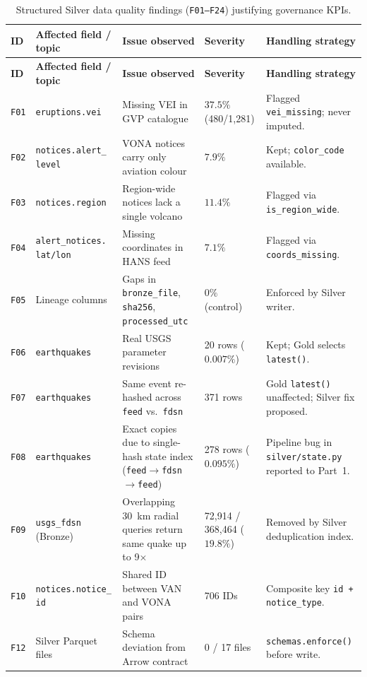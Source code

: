 \documentclass[11pt,a4paper]{article}
\begin{document}
\begin{longtable}{L{0.8cm}L{3.1cm}L{4.0cm}L{2.5cm}L{3.8cm}}
\caption{Structured Silver data quality findings (\texttt{F01--F24}) justifying governance KPIs.}\label{tab:dq_findings}\\
\toprule
\textbf{ID} & \textbf{Affected field / topic} & \textbf{Issue observed} & \textbf{Severity} & \textbf{Handling strategy}\\
\midrule
\endfirsthead
\toprule
\textbf{ID} & \textbf{Affected field / topic} & \textbf{Issue observed} & \textbf{Severity} & \textbf{Handling strategy}\\
\midrule
\endhead
\texttt{F01} & \texttt{eruptions.vei} & Missing VEI in GVP catalogue & $37.5\%$ (480/1,281) & Flagged \texttt{vei\_missing}; never imputed.\\
\texttt{F02} & \texttt{notices.alert\_ level} & VONA notices carry only aviation colour & $7.9\%$ & Kept; \texttt{color\_code} available.\\
\texttt{F03} & \texttt{notices.region} & Region-wide notices lack a single volcano & $11.4\%$ & Flagged via \texttt{is\_region\_wide}.\\
\texttt{F04} & \texttt{alert\_notices. lat/lon} & Missing coordinates in HANS feed & $7.1\%$ & Flagged via \texttt{coords\_missing}.\\
\texttt{F05} & Lineage columns & Gaps in \texttt{bronze\_file}, \texttt{sha256}, \texttt{processed\_utc} & $0\%$ (control) & Enforced by Silver writer.\\
\texttt{F06} & \texttt{earthquakes} & Real USGS parameter revisions & 20 rows ($0.007\%$) & Kept; Gold selects \texttt{latest()}.\\
\texttt{F07} & \texttt{earthquakes} & Same event re-hashed across \texttt{feed} vs.\ \texttt{fdsn} & 371 rows & Gold \texttt{latest()} unaffected; Silver fix proposed.\\
\texttt{F08} & \texttt{earthquakes} & Exact copies due to single-hash state index (\texttt{feed$\to$fdsn$\to$feed}) & 278 rows ($0.095\%$) & Pipeline bug in \texttt{silver/state.py} reported to Part~1.\\
\texttt{F09} & \texttt{usgs\_fdsn} (Bronze) & Overlapping 30~km radial queries return same quake up to 9$\times$ & 72,914 / 368,464 ($19.8\%$) & Removed by Silver deduplication index.\\
\texttt{F10} & \texttt{notices.notice\_ id} & Shared ID between VAN and VONA pairs & 706 IDs & Composite key \texttt{id + notice\_type}.\\
\texttt{F12} & Silver Parquet files & Schema deviation from Arrow contract & 0 / 17 files & \texttt{schemas.enforce()} before write.\\

\end{longtable}
\end{document}
